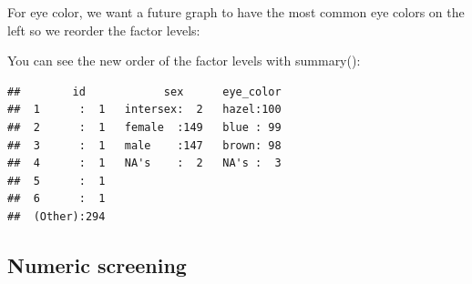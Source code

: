 \documentclass[
]{krantz}
\makeatletter
\newenvironment{Shaded}{\begin{snugshade}}{\end{snugshade}}
\newcommand{\DataTypeTok}[1]{\textcolor[rgb]{0.27,0.27,0.27}{#1}}
\newcommand{\KeywordTok}[1]{\textcolor[rgb]{0.27,0.27,0.27}{\textbf{#1}}}
\newcommand{\NormalTok}[1]{#1}
\newcommand{\OperatorTok}[1]{\textcolor[rgb]{0.43,0.43,0.43}{\textbf{#1}}}
\newcommand{\StringTok}[1]{\textcolor[rgb]{0.5,0.5,0.5}{#1}}
\newenvironment{kframe}{%
\medskip{}
\setlength{\fboxsep}{.8em}
 \def\at@end@of@kframe{}%
 \ifinner\ifhmode%
  \def\at@end@of@kframe{\end{minipage}}%
  \begin{minipage}{\columnwidth}%
 \fi\fi%
 \def\FrameCommand##1{\hskip\@totalleftmargin \hskip-\fboxsep
 \colorbox{shadecolor}{##1}\hskip-\fboxsep
     \hskip-\linewidth \hskip-\@totalleftmargin \hskip\columnwidth}%
 \MakeFramed {\advance\hsize-\width
   \@totalleftmargin\z@ \linewidth\hsize
   \@setminipage}}%
 {\par\unskip\endMakeFramed%
 \at@end@of@kframe}
\renewenvironment{Shaded}{\begin{kframe}}{\end{kframe}}
\makeatother
\begin{document}
\begin{Shaded}
\end{Shaded}

For eye color, we want a future graph to have the most common eye colors on the left so we reorder the factor levels:

\begin{Shaded}
\end{Shaded}

You can see the new order of the factor levels with summary():

\begin{Shaded}
\end{Shaded}

\begin{verbatim}
##        id            sex      eye_color  
##  1      :  1   intersex:  2   hazel:100  
##  2      :  1   female  :149   blue : 99  
##  3      :  1   male    :147   brown: 98  
##  4      :  1   NA's    :  2   NA's :  3  
##  5      :  1                             
##  6      :  1                             
##  (Other):294
\end{verbatim}

\hypertarget{numeric-screening-4}{%
\subsection{Numeric screening}\label{numeric-screening-4}}
\end{document}
